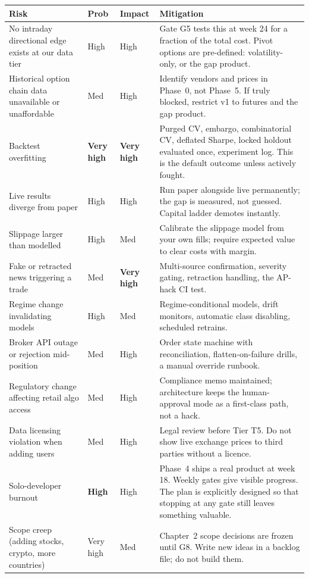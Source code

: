 \begin{longtable}{@{}p{3.6cm}p{1.2cm}p{1.2cm}p{7.8cm}@{}}
\toprule
\textbf{Risk} & \textbf{Prob} & \textbf{Impact} & \textbf{Mitigation}\\
\midrule
\endhead
No intraday directional edge exists at our data tier & High & High &
Gate G5 tests this at week 24 for a fraction of the total cost. Pivot options
are pre-defined: volatility-only, or the gap product.\\
Historical option chain data unavailable or unaffordable & Med & High &
Identify vendors and prices in Phase~0, not Phase~5. If truly blocked, restrict
v1 to futures and the gap product.\\
Backtest overfitting & \textbf{Very high} & \textbf{Very high} & Purged CV,
embargo, combinatorial CV, deflated Sharpe, locked holdout evaluated once,
experiment log. This is the default outcome unless actively fought.\\
Live results diverge from paper & High & High & Run paper alongside live
permanently; the gap is measured, not guessed. Capital ladder demotes instantly.\\
Slippage larger than modelled & High & Med & Calibrate the slippage model from
your own fills; require expected value to clear costs with margin.\\
Fake or retracted news triggering a trade & Med & \textbf{Very high} &
Multi-source confirmation, severity gating, retraction handling, the AP-hack CI
test.\\
Regime change invalidating models & High & Med & Regime-conditional models,
drift monitors, automatic class disabling, scheduled retrains.\\
Broker API outage or rejection mid-position & Med & High & Order state machine
with reconciliation, flatten-on-failure drills, a manual override runbook.\\
Regulatory change affecting retail algo access & Med & High & Compliance memo
maintained; architecture keeps the human-approval mode as a first-class path,
not a hack.\\
Data licensing violation when adding users & Med & High & Legal review before
Tier T5. Do not show live exchange prices to third parties without a licence.\\
Solo-developer burnout & \textbf{High} & High & Phase~4 ships a real product at
week 18. Weekly gates give visible progress. The plan is explicitly designed so
that stopping at any gate still leaves something valuable.\\
Scope creep (adding stocks, crypto, more countries) & Very high & Med &
Chapter~2 scope decisions are frozen until G8. Write new ideas in a backlog
file; do not build them.\\
\bottomrule
\end{longtable}

